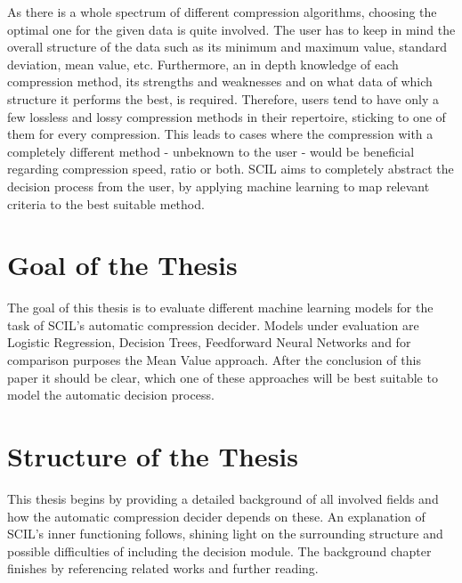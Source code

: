 \documentclass[
	12pt,
	a4paper,
	BCOR10mm,
	DIV14,
	headsepline,
]{scrreprt}
\begin{document}
As there is a whole spectrum of different compression algorithms, choosing the optimal one for the given data is quite involved.
The user has to keep in mind the overall structure of the data such as its minimum and maximum value, standard deviation, mean value, etc.
Furthermore, an in depth knowledge of each compression method, its strengths and weaknesses and on what data of which structure it performs the best, is required. %
Therefore, users tend to have only a few lossless and lossy compression methods in their repertoire, sticking to one of them for every compression.
This leads to cases where the compression with a completely different method - unbeknown to the user - would be beneficial regarding compression speed, ratio or both.
SCIL aims to completely abstract the decision process from the user, by applying machine learning to map relevant criteria to the best suitable method.

\section{Goal of the Thesis}
\label{s:gott}


The goal of this thesis is to evaluate different machine learning models for the task of SCIL's automatic compression decider.
Models under evaluation are Logistic Regression, Decision Trees, Feedforward Neural Networks and for comparison purposes the Mean Value approach.
After the conclusion of this paper it should be clear, which one of these approaches will be best suitable to model the automatic decision process.

\section{Structure of the Thesis}
\label{s:sott}

This thesis begins by providing a detailed background of all involved fields and how the automatic compression decider depends on these.
An explanation of SCIL's inner functioning follows, shining light on the surrounding structure and possible difficulties of including the decision module. %
The background chapter finishes by referencing related works and further reading. \par %
\end{document}
